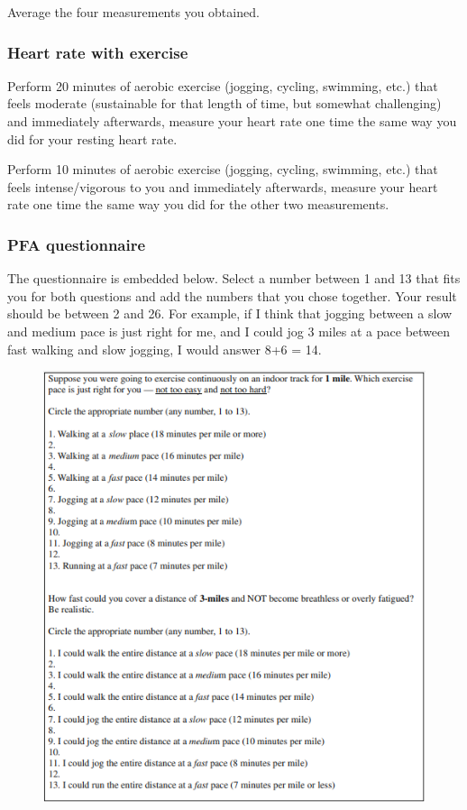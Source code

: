 \documentclass{article}
\begin{document}
Average the four measurements you obtained.

\subsubsection{Heart rate with exercise}

Perform 20 minutes of aerobic exercise (jogging, cycling, swimming, etc.) that feels moderate (sustainable for that length of time, but somewhat challenging) and immediately afterwards, measure your heart rate one time the same way you did for your resting heart rate.

Perform 10 minutes of aerobic exercise (jogging, cycling, swimming, etc.) that feels intense/vigorous to you and immediately afterwards, measure your heart rate one time the same way you did for the other two measurements.

\subsubsection{PFA questionnaire}
The questionnaire is embedded below. Select a number between 1 and 13 that fits you for both questions and add the numbers that you chose together. Your result should be between 2 and 26. For example, if I think that jogging between a slow and medium pace is just right for me, and I could jog 3 miles at a pace between fast walking and slow jogging, I would answer 8+6 = 14.

\begin{figure}[h!]
\centering
\includegraphics[width=0.8\linewidth]{pics/pfa.png}
\end{figure}
\end{document}

